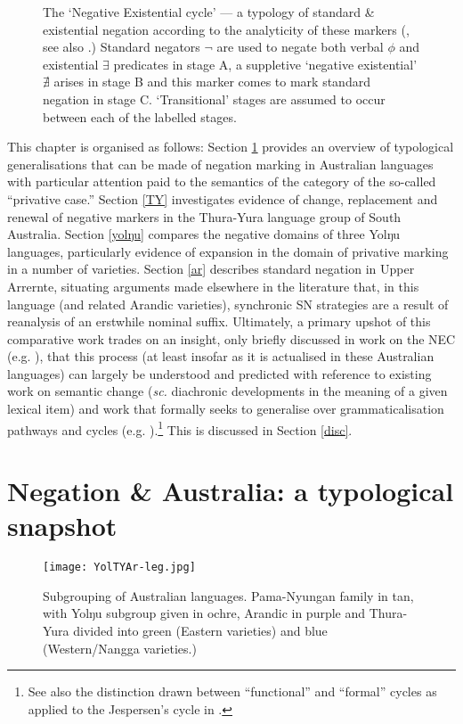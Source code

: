 \documentclass[usenames,dvipsnames,11pt]{article}
\begin{document}
{\begin{figure}[h]
	\caption{\small The `Negative Existential cycle' --- a typology of standard \& existential negation according to the analyticity of these markers (\citealt{Croft1991}, see also \citealt{Veselinova2016}.) Standard negators $\neg$ are used to negate both verbal $\phi$ and existential $\exists$ predicates in stage A, a suppletive `negative existential' $\nexists$ arises in stage B and this marker comes to mark standard negation in stage C. `Transitional' stages are assumed to occur between each of the labelled stages.}\label{croftcycle}
\end{figure}

This chapter is organised as follows: Section \ref{typ-sec} provides an overview of typological generalisations that can be made of negation marking in Australian languages with particular attention paid to the semantics of the category of the so-called ``privative case.'' Section \ref{TY} investigates evidence of change, replacement and renewal of negative markers in the Thura-Yura language group of South Australia. Section \ref{yolŋu} compares the negative domains of three Yolŋu languages, particularly evidence of expansion in the domain of privative marking in a number of varieties. Section \ref{ar} describes standard negation in Upper Arrernte, situating arguments made elsewhere in the literature \citep[particularly][]{Henderson2013} that, in this language (and related Arandic varieties), synchronic SN strategies are a result of reanalysis of an erstwhile nominal suffix. Ultimately, a primary upshot of this comparative work trades on an insight, only briefly discussed in work on the NEC (e.g. \citealt[17]{Croft1991}), that this process (at least insofar as it is actualised in these Australian languages) can largely be understood and predicted with reference to existing work on semantic change (\textit{sc.} diachronic developments in the meaning of a given lexical item) and work that formally seeks to generalise over grammaticalisation pathways and cycles (e.g. \citealt{Deo2015,Deo2015a,Deo2018}).\footnote{See also the distinction drawn between ``functional'' and ``formal'' cycles as applied to the Jespersen's cycle in \citet{Ahern2017}.} This is discussed in Section \ref{disc}.

\section{Negation \& Australia: a typological snapshot}\label{typ-sec}
\begin{figure}\centering
	\texttt{[image: YolTYAr-leg.jpg]}
	\caption{{\small Subgrouping of Australian languages. Pama-Nyungan family in tan, with Yolŋu subgroup given in ochre, Arandic in purple and Thura-Yura divided into green (Eastern varieties) and blue (Western/Nangga varieties.) }}\label{Map}
\end{figure}

}
\end{document}
